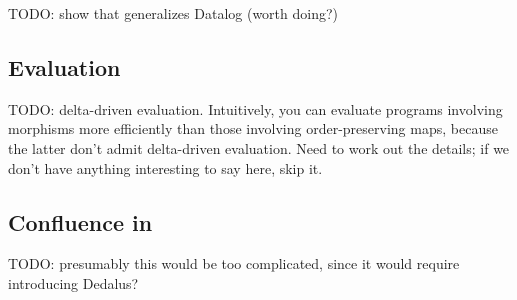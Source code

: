 TODO: show that \baselang generalizes Datalog (worth doing?)

\subsection{Evaluation}

TODO: delta-driven evaluation. Intuitively, you can evaluate programs involving
morphisms more efficiently than those involving order-preserving maps, because
the latter don't admit delta-driven evaluation. Need to work out the details; if
we don't have anything interesting to say here, skip it.

\subsection{Confluence in \baselang}

TODO: presumably this would be too complicated, since it would require
introducing Dedalus?
